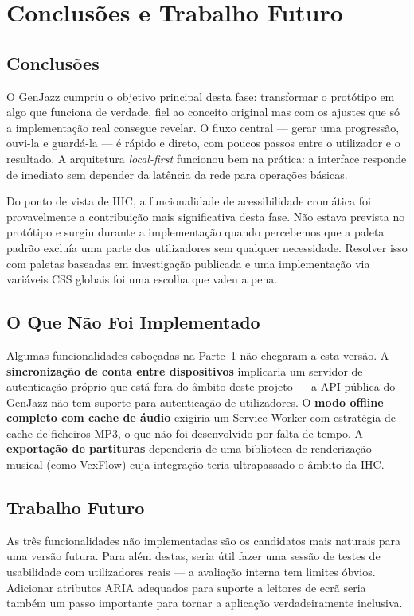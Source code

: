 \chapter{Conclusões e Trabalho Futuro}
\label{chap:conc-trab-futuro}

\section{Conclusões}
\label{sec:conc-princ}

O GenJazz cumpriu o objetivo principal desta fase: transformar o protótipo em algo que funciona de verdade, fiel ao conceito original mas com os ajustes que só a implementação real consegue revelar. O fluxo central --- gerar uma progressão, ouvi-la e guardá-la --- é rápido e direto, com poucos passos entre o utilizador e o resultado. A arquitetura \textit{local-first} funcionou bem na prática: a interface responde de imediato sem depender da latência da rede para operações básicas.

Do ponto de vista de \ac{IHC}, a funcionalidade de acessibilidade cromática foi provavelmente a contribuição mais significativa desta fase. Não estava prevista no protótipo e surgiu durante a implementação quando percebemos que a paleta padrão excluía uma parte dos utilizadores sem qualquer necessidade. Resolver isso com paletas baseadas em investigação publicada e uma implementação via variáveis CSS globais foi uma escolha que valeu a pena.

\section{O Que Não Foi Implementado}
\label{sec:nao-implementado}

Algumas funcionalidades esboçadas na Parte~1 não chegaram a esta versão. A \textbf{sincronização de conta entre dispositivos} implicaria um servidor de autenticação próprio que está fora do âmbito deste projeto --- a API pública do GenJazz não tem suporte para autenticação de utilizadores. O \textbf{modo offline completo com cache de áudio} exigiria um Service Worker com estratégia de cache de ficheiros MP3, o que não foi desenvolvido por falta de tempo. A \textbf{exportação de partituras} dependeria de uma biblioteca de renderização musical (como VexFlow) cuja integração teria ultrapassado o âmbito da \ac{IHC}.

\section{Trabalho Futuro}
\label{sec:trab-futuro}

As três funcionalidades não implementadas são os candidatos mais naturais para uma versão futura. Para além destas, seria útil fazer uma sessão de testes de usabilidade com utilizadores reais --- a avaliação interna tem limites óbvios. Adicionar atributos ARIA adequados para suporte a leitores de ecrã seria também um passo importante para tornar a aplicação verdadeiramente inclusiva.
